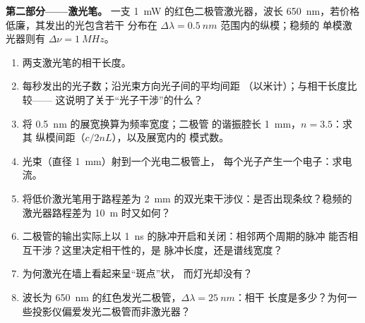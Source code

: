 \begin{problem}
\medskip
\noindent\textbf{第二部分——激光笔。}
一支 \qty{1}{mW} 的红色二极管激光器，波长 \qty{650}{nm}，若价格低廉，其发出的光包含若干
分布在 $\Delta\lambda = \qty{0.5}{nm}$ 范围内的纵模；稳频的
单模激光器则有 $\Delta\nu = \qty{1}{MHz}$。
\begin{enumerate}[resume]
  \item 两支激光笔的相干长度。
  \item 每秒发出的光子数；沿光束方向光子间的平均间距
        （以米计）；与相干长度比较——
        这说明了关于“光子干涉”的什么？
  \item 将 \qty{0.5}{nm} 的展宽换算为频率宽度；二极管
        的谐振腔长 \qty{1}{mm}，$n = 3.5$：求其
        纵模间距（$c/2nL$），以及展宽内的
        模式数。
  \item 光束（直径 \qty{1}{mm}）射到一个光电二极管上，
        每个光子产生一个电子：求电流。
  \item 将低价激光笔用于路程差为
        \qty{2}{mm} 的双光束干涉仪：是否出现条纹？稳频的
        激光器路程差为 \qty{10}{m} 时又如何？
  \item 二极管的输出实际上以
        \qty{1}{ns} 的脉冲开启和关闭：相邻两个周期的脉冲
        能否相互干涉？这里决定相干性的，是
        脉冲长度，还是谱线宽度？
  \item 为何激光在墙上看起来呈“斑点”状，
        而灯光却没有？
  \item 波长为 \qty{650}{nm} 的红色发光二极管，$\Delta\lambda = \qty{25}{nm}$：相干
        长度是多少？为何一些投影仪偏爱发光二极管而非激光器？
\end{enumerate}


\end{problem}
